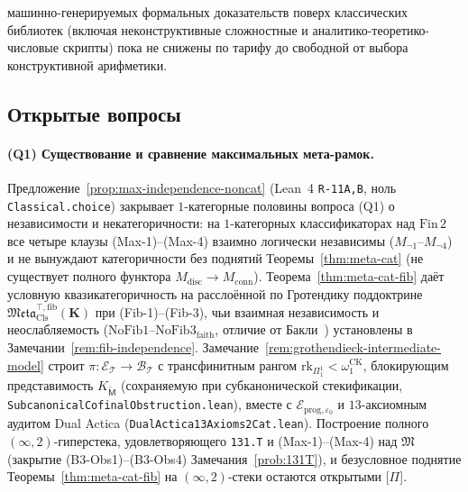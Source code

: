 \documentclass[11pt]{article}
\theoremstyle{plain}
\theoremstyle{definition}
\newcommand{\fM}{\mathfrak{M}}
\newcommand{\Meta}{\mathfrak{Meta}}
\begin{document}
машинно-генерируемых формальных доказательств поверх классических библиотек (включая неконструктивные сложностные и аналитико-теоретико-числовые скрипты) пока не снижены по тарифу до свободной от выбора конструктивной арифметики.

\subsection{Открытые вопросы}

\paragraph{(Q1) Существование и сравнение максимальных мета-рамок.} Предложение~\ref{prop:max-independence-noncat} (Lean~4 \texttt{R-11A,B}, ноль \texttt{Classical.choice}) закрывает $1$-категорные половины вопроса (Q1) о независимости и некатегоричности: на $1$-категорных классификаторах над $\mathrm{Fin}\,2$ все четыре клаузы (Max-1)--(Max-4) взаимно логически независимы ($M_{\neg 1}\text{--}M_{\neg 4}$) и не вынуждают категоричности без поднятий Теоремы~\ref{thm:meta-cat} (не существует полного функтора $M_{\mathrm{disc}} \to M_{\mathrm{conn}}$). Теорема~\ref{thm:meta-cat-fib} даёт условную квазикатегоричность на расслоённой по Гротендику поддоктрине $\Meta_{\mathrm{Cls}}^{\top,\mathrm{fib}}(\mathbf{K})$ при (Fib-1)--(Fib-3), чьи взаимная независимость и неослабляемость ($\mathrm{NoFib1}$--$\mathrm{NoFib3}_{\mathrm{faith}}$, отличие от Бакли~\cite{Buckley2014}) установлены в Замечании~\ref{rem:fib-independence}. Замечание~\ref{rem:grothendieck-intermediate-model} строит $\pi : \mathcal{E}_{\mathcal{T}} \to \mathcal{B}_{\mathcal{T}}$ с трансфинитным рангом $\mathrm{rk}_{\Pi_1^1} < \omega_1^{\mathrm{CK}}$, блокирующим представимость $K_{\widetilde{\mathsf{M}}}$ (сохраняемую при субканонической стекификации, \texttt{SubcanonicalCofinalObstruction.lean}), вместе с $\mathcal{E}_{\mathrm{prog},\varepsilon_0}$ и $13$-аксиомным аудитом Dual Actica (\texttt{DualActica13Axioms2Cat.lean}). Построение полного $(\infty, 2)$-гиперстека, удовлетворяющего \texttt{131.T} и (Max-1)--(Max-4) над $\fM$ (закрытие (B3-Obs1)--(B3-Obs4) Замечания~\ref{prob:131T}), и безусловное поднятие Теоремы~\ref{thm:meta-cat-fib} на $(\infty, 2)$-стеки остаются открытыми \textup{[\textbf{$\Pi$}]}.
\end{document}
